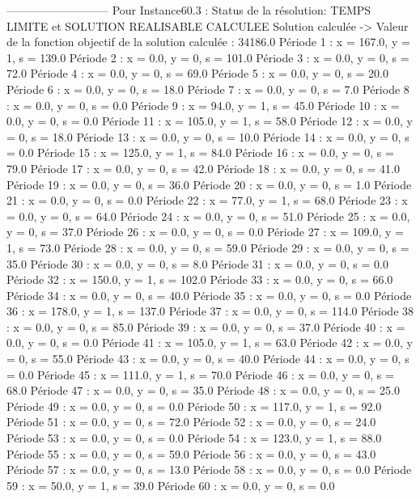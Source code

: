 ---------------------------
Pour Instance60.3  :
Status de la résolution: TEMPS LIMITE et SOLUTION REALISABLE CALCULEE
Solution calculée
-> Valeur de la fonction objectif de la solution calculée :  34186.0
Période 1 : x = 167.0, y = 1, s = 139.0
Période 2 : x = 0.0, y = 0, s = 101.0
Période 3 : x = 0.0, y = 0, s = 72.0
Période 4 : x = 0.0, y = 0, s = 69.0
Période 5 : x = 0.0, y = 0, s = 20.0
Période 6 : x = 0.0, y = 0, s = 18.0
Période 7 : x = 0.0, y = 0, s = 7.0
Période 8 : x = 0.0, y = 0, s = 0.0
Période 9 : x = 94.0, y = 1, s = 45.0
Période 10 : x = 0.0, y = 0, s = 0.0
Période 11 : x = 105.0, y = 1, s = 58.0
Période 12 : x = 0.0, y = 0, s = 18.0
Période 13 : x = 0.0, y = 0, s = 10.0
Période 14 : x = 0.0, y = 0, s = 0.0
Période 15 : x = 125.0, y = 1, s = 84.0
Période 16 : x = 0.0, y = 0, s = 79.0
Période 17 : x = 0.0, y = 0, s = 42.0
Période 18 : x = 0.0, y = 0, s = 41.0
Période 19 : x = 0.0, y = 0, s = 36.0
Période 20 : x = 0.0, y = 0, s = 1.0
Période 21 : x = 0.0, y = 0, s = 0.0
Période 22 : x = 77.0, y = 1, s = 68.0
Période 23 : x = 0.0, y = 0, s = 64.0
Période 24 : x = 0.0, y = 0, s = 51.0
Période 25 : x = 0.0, y = 0, s = 37.0
Période 26 : x = 0.0, y = 0, s = 0.0
Période 27 : x = 109.0, y = 1, s = 73.0
Période 28 : x = 0.0, y = 0, s = 59.0
Période 29 : x = 0.0, y = 0, s = 35.0
Période 30 : x = 0.0, y = 0, s = 8.0
Période 31 : x = 0.0, y = 0, s = 0.0
Période 32 : x = 150.0, y = 1, s = 102.0
Période 33 : x = 0.0, y = 0, s = 66.0
Période 34 : x = 0.0, y = 0, s = 40.0
Période 35 : x = 0.0, y = 0, s = 0.0
Période 36 : x = 178.0, y = 1, s = 137.0
Période 37 : x = 0.0, y = 0, s = 114.0
Période 38 : x = 0.0, y = 0, s = 85.0
Période 39 : x = 0.0, y = 0, s = 37.0
Période 40 : x = 0.0, y = 0, s = 0.0
Période 41 : x = 105.0, y = 1, s = 63.0
Période 42 : x = 0.0, y = 0, s = 55.0
Période 43 : x = 0.0, y = 0, s = 40.0
Période 44 : x = 0.0, y = 0, s = 0.0
Période 45 : x = 111.0, y = 1, s = 70.0
Période 46 : x = 0.0, y = 0, s = 68.0
Période 47 : x = 0.0, y = 0, s = 35.0
Période 48 : x = 0.0, y = 0, s = 25.0
Période 49 : x = 0.0, y = 0, s = 0.0
Période 50 : x = 117.0, y = 1, s = 92.0
Période 51 : x = 0.0, y = 0, s = 72.0
Période 52 : x = 0.0, y = 0, s = 24.0
Période 53 : x = 0.0, y = 0, s = 0.0
Période 54 : x = 123.0, y = 1, s = 88.0
Période 55 : x = 0.0, y = 0, s = 59.0
Période 56 : x = 0.0, y = 0, s = 43.0
Période 57 : x = 0.0, y = 0, s = 13.0
Période 58 : x = 0.0, y = 0, s = 0.0
Période 59 : x = 50.0, y = 1, s = 39.0
Période 60 : x = 0.0, y = 0, s = 0.0

